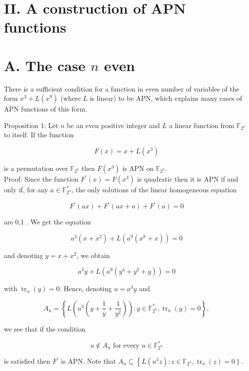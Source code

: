 \documentclass[10pt]{article}
\begin{document}
\section*{II. A construction of APN functions}
\section*{A. The case $n$ even}
There is a sufficient condition for a function in even number of variables of the form $x^{3}+L\left(x^{9}\right)$ (where $L$ is linear) to be APN, which explains many cases of APN functions of this form.

Proposition 1: Let $n$ be an even positive integer and $L$ a linear function from $\mathbb{F}_{2^{n}}$ to itself. If the function

$$
F(x)=x+L\left(x^{3}\right)
$$

is a permutation over $\mathbb{F}_{2^{n}}$ then $F\left(x^{3}\right)$ is APN on $\mathbb{F}_{2^{n}}$.\\
Proof: Since the function $F^{\prime}(x)=F\left(x^{3}\right)$ is quadratic then it is APN if and only if, for any $a \in \mathbb{F}_{2^{n}}^{*}$, the only solutions of the linear homogeneous equation


\begin{equation*}
F^{\prime}(a x)+F^{\prime}(a x+a)+F^{\prime}(a)=0 \tag{1}
\end{equation*}


are 0,1 . We get the equation

$$
a^{3}\left(x+x^{2}\right)+L\left(a^{9}\left(x^{8}+x\right)\right)=0
$$

and denoting $y=x+x^{2}$, we obtain

$$
a^{3} y+L\left(a^{9}\left(y^{4}+y^{2}+y\right)\right)=0
$$

with $\operatorname{tr}_{n}(y)=0$. Hence, denoting $u=a^{3} y$ and

$$
A_{u}=\left\{L\left(u^{3}\left(y+\frac{1}{y}+\frac{1}{y^{2}}\right)\right): y \in \mathbb{F}_{2^{n}}^{*}, \operatorname{tr}_{n}(y)=0\right\},
$$

we see that if the condition


\begin{equation*}
u \notin A_{u} \text { for every } u \in \mathbb{F}_{2^{n}}^{*} \tag{2}
\end{equation*}


is satisfied then $F^{\prime}$ is APN. Note that $A_{u} \subseteq\left\{L\left(u^{3} z\right): z \in\right. \left.\mathbb{F}_{2^{n}}, \operatorname{tr}_{n}(z)=0\right\}$.
\end{document}
